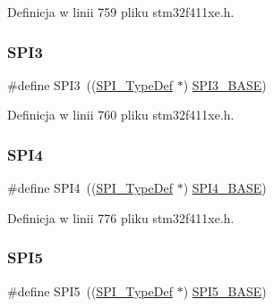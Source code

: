 Definicja w linii 759 pliku stm32f411xe.\+h.

\mbox{\label{group___peripheral__declaration_gab2339cbf25502bf562b19208b1b257fc}} 
\subsubsection{\texorpdfstring{S\+P\+I3}{SPI3}}
{\footnotesize\ttfamily \#define S\+P\+I3~((\hyperlink{struct_s_p_i___type_def}{S\+P\+I\+\_\+\+Type\+Def} $\ast$) \hyperlink{group___peripheral__memory__map_gae634fe8faa6922690e90fbec2fc86162}{S\+P\+I3\+\_\+\+B\+A\+SE})}



Definicja w linii 760 pliku stm32f411xe.\+h.

\mbox{\label{group___peripheral__declaration_ga2a2e6edef68cfe1946f39a5033da2301}} 
\subsubsection{\texorpdfstring{S\+P\+I4}{SPI4}}
{\footnotesize\ttfamily \#define S\+P\+I4~((\hyperlink{struct_s_p_i___type_def}{S\+P\+I\+\_\+\+Type\+Def} $\ast$) \hyperlink{group___peripheral__memory__map_gac5cfaedf263cee1e79554665f921c708}{S\+P\+I4\+\_\+\+B\+A\+SE})}



Definicja w linii 776 pliku stm32f411xe.\+h.

\mbox{\label{group___peripheral__declaration_ga5e676c061e19ced149b7c6de6b8985e5}} 
\subsubsection{\texorpdfstring{S\+P\+I5}{SPI5}}
{\footnotesize\ttfamily \#define S\+P\+I5~((\hyperlink{struct_s_p_i___type_def}{S\+P\+I\+\_\+\+Type\+Def} $\ast$) \hyperlink{group___peripheral__memory__map_gac1c58d33414e167d478ecd0e31331dfa}{S\+P\+I5\+\_\+\+B\+A\+SE})}



